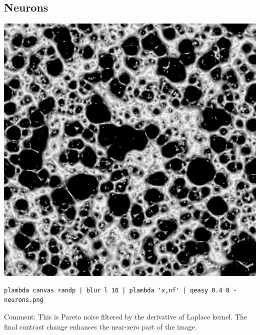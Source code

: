 \subsection{Neurons}
\includegraphics{neurons.png}
\begin{verbatim}
plambda canvas randp | blur l 10 | plambda 'x,nf' | qeasy 0.4 0 - neurons.png
\end{verbatim}
Comment: This is Pareto noise filtered by the derivative of Laplace kernel.
The final contrast change enhances the near-zero part of the image.

